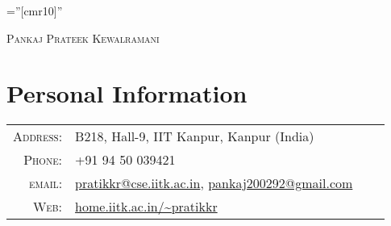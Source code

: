 \documentclass[a4paper,10pt]{article}
\begin{document}

\newcommand{\specialcell}[2][c]{%
  \begin{tabular}[#1]{@{}c@{}}#2\end{tabular}}
  
\pagestyle{empty} %

\font\fb=''[cmr10]'' %

\par{\centering
		{\Huge \textsc{Pankaj Prateek Kewalramani}
	}\par}

\section{Personal Information}

\begin{tabular}{rlrl}
    \textsc{Address:}   & B218, Hall-9, IIT Kanpur, Kanpur (India) \\
    \textsc{Phone:}     & +91 94 50 039421\\
    \textsc{email:}     & \href{mailto:pratikkr@cse.iitk.ac.in}{pratikkr@cse.iitk.ac.in},
                        \href{mailto:pankaj200292@gmail.com}{pankaj200292@gmail.com} \\
    \textsc{Web:}       & \href{http://home.iitk.ac.in/~pratikkr}{home.iitk.ac.in/\textasciitilde pratikkr}
\end{tabular}

\end{document}
